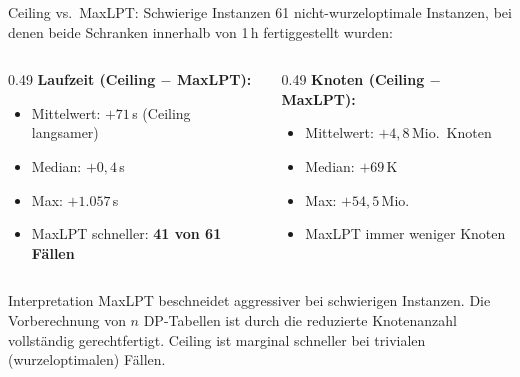 \documentclass[fleqn,11pt,aspectratio=43]{beamer}
\begin{document}
\begin{frame}[shrink=5]{Ceiling vs.\ MaxLPT: Schwierige Instanzen}
  61 nicht-wurzeloptimale Instanzen, bei denen beide Schranken innerhalb von 1\,h fertiggestellt wurden:
  \begin{columns}[T]
    \begin{column}{0.49\textwidth}
      \textbf{Laufzeit (Ceiling $-$ MaxLPT):}
      \begin{itemize}
        \item Mittelwert: $+71$\,s (Ceiling langsamer)
        \item Median: $+0{,}4$\,s
        \item Max: $+1{.}057$\,s
        \item MaxLPT schneller: \textbf{41 von 61 Fällen}
      \end{itemize}
    \end{column}
    \begin{column}{0.49\textwidth}
      \textbf{Knoten (Ceiling $-$ MaxLPT):}
      \begin{itemize}
        \item Mittelwert: $+4{,}8$\,Mio.\ Knoten
        \item Median: $+69$\,K
        \item Max: $+54{,}5$\,Mio.
        \item MaxLPT immer weniger Knoten
      \end{itemize}
    \end{column}
  \end{columns}
  \begin{block}{Interpretation}
    \small MaxLPT beschneidet aggressiver bei schwierigen Instanzen.
    Die Vorberechnung von $n$ DP-Tabellen ist durch die reduzierte Knotenanzahl vollständig gerechtfertigt.
    Ceiling ist marginal schneller bei trivialen (wurzeloptimalen) Fällen.
  \end{block}
\end{frame}
\end{document}

